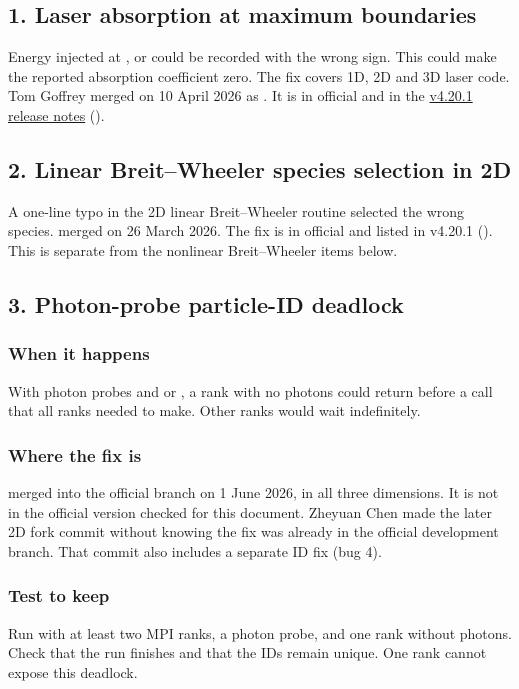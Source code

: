 \subsection*{1. Laser absorption at maximum boundaries}
\label{bug:1}
Energy injected at ,  or 
could be recorded with the wrong sign. This could make the reported
absorption coefficient zero. The fix covers 1D, 2D and 3D laser code.
Tom Goffrey merged  on 10 April 2026 as
. It is in official  and in the
\href{https://github.com/epochpic/epoch/releases/tag/v4.20.1}{v4.20.1
release notes} ().

\subsection*{2. Linear Breit--Wheeler species selection in 2D}
\label{bug:2}
A one-line typo in the 2D linear Breit--Wheeler routine selected the
wrong species.  merged  on
26 March 2026. The fix is in official  and listed in
v4.20.1 (). This is separate from the nonlinear
Breit--Wheeler items below.

\subsection*{3. Photon-probe particle-ID deadlock}
\label{bug:3}
\subsubsection*{When it happens}
With photon probes and  or ,
a rank with no photons could return before a call that all ranks
needed to make. Other ranks would wait indefinitely.

\subsubsection*{Where the fix is}
 merged  into the official
 branch on 1 June 2026, in all three dimensions.
It is not in the official  version checked for this
document. Zheyuan Chen made the later 2D fork commit
without knowing the fix was already in the official development
branch. That commit also includes a separate ID fix (bug 4).

\subsubsection*{Test to keep}
Run with at least two MPI ranks, a photon probe, and one rank
without photons. Check that the run finishes and that the IDs
remain unique. One rank cannot expose this deadlock.

